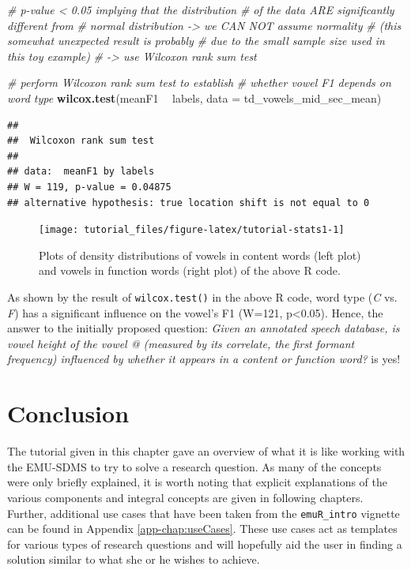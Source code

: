 \documentclass[]{book}
\newenvironment{Shaded}{\begin{snugshade}}{\end{snugshade}}
\newcommand{\CommentTok}[1]{\textcolor[rgb]{0.56,0.35,0.01}{\textit{#1}}}
\newcommand{\DataTypeTok}[1]{\textcolor[rgb]{0.13,0.29,0.53}{#1}}
\newcommand{\KeywordTok}[1]{\textcolor[rgb]{0.13,0.29,0.53}{\textbf{#1}}}
\newcommand{\NormalTok}[1]{#1}
\newcommand{\OperatorTok}[1]{\textcolor[rgb]{0.81,0.36,0.00}{\textbf{#1}}}
\newcommand{\StringTok}[1]{\textcolor[rgb]{0.31,0.60,0.02}{#1}}
\theoremstyle{definition}
\theoremstyle{definition}
\theoremstyle{definition}
\theoremstyle{remark}
\begin{document}
\begin{Shaded}
\begin{Highlighting}[]
\CommentTok{# p-value < 0.05 implying that the distribution}
\CommentTok{# of the data ARE significantly different from}
\CommentTok{# normal distribution -> we CAN NOT assume normality}
\CommentTok{# (this somewhat unexpected result is probably}
\CommentTok{# due to the small sample size used in this toy example)}
\CommentTok{# -> use Wilcoxon rank sum test}

\CommentTok{# perform Wilcoxon rank sum test to establish}
\CommentTok{# whether vowel F1 depends on word type}
\KeywordTok{wilcox.test}\NormalTok{(meanF1 }\OperatorTok{~}\StringTok{ }\NormalTok{labels, }\DataTypeTok{data =}\NormalTok{ td_vowels_mid_sec_mean)}
\end{Highlighting}
\end{Shaded}

\begin{verbatim}
## 
##  Wilcoxon rank sum test
## 
## data:  meanF1 by labels
## W = 119, p-value = 0.04875
## alternative hypothesis: true location shift is not equal to 0
\end{verbatim}

\begin{figure}

{\centering \texttt{[image: tutorial\_files/figure-latex/tutorial-stats1-1]} 

}

\caption{Plots of density distributions of vowels in content words (left plot) and vowels in function words (right plot) of the above R code.}\label{fig:tutorial-stats1}
\end{figure}

As shown by the result of \texttt{wilcox.test()} in the above R code,
word type (\emph{C} vs. \emph{F}) has a significant influence on the
vowel's F1 (W=121, p\textless{}0.05). Hence, the answer to the initially
proposed question: \emph{Given an annotated speech database, is vowel
height of the vowel @ (measured by its correlate, the first formant
frequency) influenced by whether it appears in a content or function
word?} is yes!

\hypertarget{conclusion}{%
\section{Conclusion}\label{conclusion}}

The tutorial given in this chapter gave an overview of what it is like
working with the EMU-SDMS to try to solve a research question. As many
of the concepts were only briefly explained, it is worth noting that
explicit explanations of the various components and integral concepts
are given in following chapters. Further, additional use cases that have
been taken from the \texttt{emuR\_intro} vignette can be found in
Appendix \ref{app-chap:useCases}. These use cases act as templates for
various types of research questions and will hopefully aid the user in
finding a solution similar to what she or he wishes to achieve.
\end{document}
